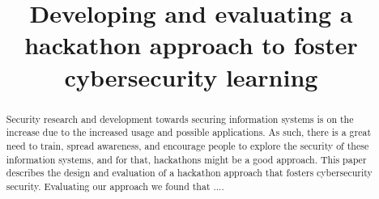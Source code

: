 \documentclass[runningheads]{llncs}
\begin{document}
%
\title{Developing and evaluating a hackathon approach to foster cybersecurity learning}
%
%

%
\authorrunning{}
%
\maketitle              %
%
\begin{abstract}
Security research and development towards securing information systems is on the increase due to the increased usage and possible applications. As such, there is a great need to train, spread awareness, and encourage people to explore the security of these information systems, and for that, hackathons might be a good approach. This paper describes the design and evaluation of a hackathon approach that fosters cybersecurity security. Evaluating our approach we found that ....
\end{abstract}
%
%
\end{document}
